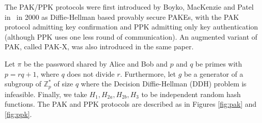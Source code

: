 

The PAK/PPK protocols were first introduced by Boyko, MacKenzie and Patel in~\cite{BoMaPa00} in 2000
as Diffie-Hellman based provably secure PAKEs, with the PAK protocol admitting key confirmation
and PPK admitting only key authentication (although PPK uses one less round of communication). 
An augmented variant of PAK, called PAK-X, was also introduced in the same paper.


Let $\pi$ be the password shared by Alice and Bob and $p$ and $q$ be primes with $p = rq+1$, where $q$ does not divide $r$.
Furthermore, let $g$ be a generator of a subgroup of $\mathbb{Z}^\ast_p$ of size $q$ where the Decision
Diffie-Hellman (DDH) problem is infeasible. Finally, we take $H_1, H_{2a}, H_{2b}, H_3$ to be independent random hash 
functions. The PAK and PPK protocols are described as in Figures \ref{fig:pak} and \ref{fig:ppk}. 

